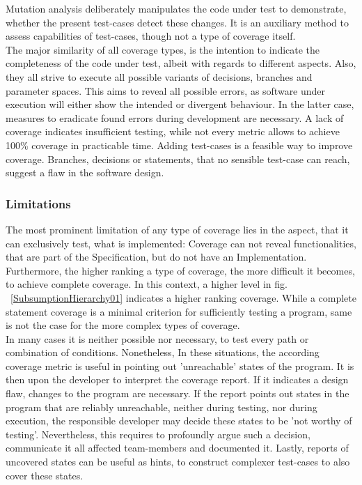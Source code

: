 	Mutation analysis deliberately manipulates the code under test to demonstrate, whether the present test-cases detect these changes. It is an auxiliary method to assess capabilities of test-cases, though not a type of coverage itself. \\

	The major similarity of all coverage types, is the intention to indicate the completeness of the code under test, albeit with regards to different aspects. Also, they all strive to execute all possible variants of decisions, branches and parameter spaces. This aims to reveal all possible errors, as software under execution will either show the intended or divergent behaviour. In the latter case, measures to eradicate found errors during development are necessary. A lack of coverage indicates insufficient testing, while not every metric allows to achieve 100\% coverage in practicable time. Adding test-cases is a feasible way to improve coverage. Branches, decisions or statements, that no sensible test-case can reach, suggest a flaw in the software design. \\

	\subsubsection{Limitations}
	The most prominent limitation of any type of coverage lies in the aspect, that it can exclusively test, what is implemented: Coverage can not reveal functionalities, that are part of the Specification, but do not have an Implementation. \\	
	Furthermore, the higher ranking a type of coverage, the more difficult it becomes, to achieve complete coverage. In this context, a higher level in fig. ~\ref{SubsumptionHierarchy01}  indicates a higher ranking coverage. While a complete statement coverage is a minimal criterion for sufficiently testing a program, same is not the case for the more complex types of coverage. \\
	In many cases it is neither possible nor necessary, to test every path or combination of conditions. Nonetheless, In these situations, the according coverage metric is useful in pointing out 'unreachable' states of the program. It is then upon the developer to interpret the coverage report. If it indicates a design flaw, changes to the program are necessary. If the report points out states in the program that are reliably unreachable, neither during testing, nor during execution, the responsible developer may decide these states to be 'not worthy of testing'. Nevertheless, this requires to profoundly argue such a decision, communicate it all affected team-members and documented it. Lastly, reports of uncovered states can be useful as hints, to construct complexer test-cases to also cover these states. \\


